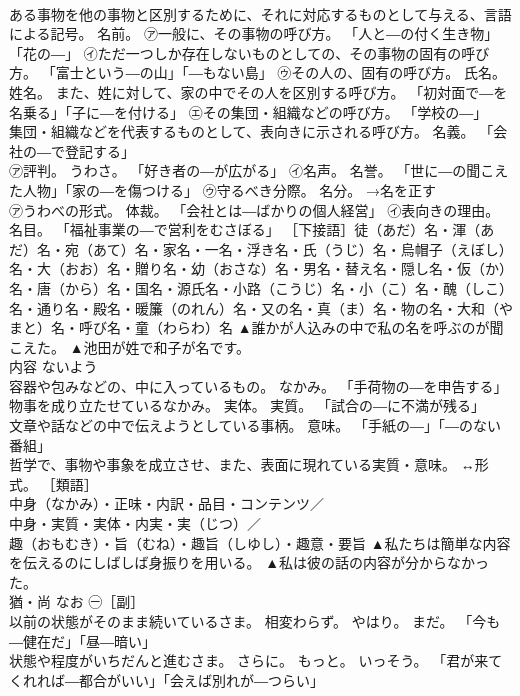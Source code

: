 \documentclass[8pt]{extreport}
\begin{document}
\begin{CJK}{UTF8}{min}
\\	ある事物を他の事物と区別するために、それに対応するものとして与える、言語による記号。 名前。 ㋐一般に、その事物の呼び方。 「人と―の付く生き物」「花の―」 ㋑ただ一つしか存在しないものとしての、その事物の固有の呼び方。 「富士という―の山」「―もない島」 ㋒その人の、固有の呼び方。 氏名。 姓名。 また、姓に対して、家の中でその人を区別する呼び方。 「初対面で―を名乗る」「子に―を付ける」 ㋓その集団・組織などの呼び方。 「学校の―」 
\\	集団・組織などを代表するものとして、表向きに示される呼び方。 名義。 「会社の―で登記する」 
\\	㋐評判。 うわさ。 「好き者の―が広がる」 ㋑名声。 名誉。 「世に―の聞こえた人物」「家の―を傷つける」 ㋒守るべき分際。 名分。 →名を正す 
\\	㋐うわべの形式。 体裁。 「会社とは―ばかりの個人経営」 ㋑表向きの理由。 名目。 「福祉事業の―で営利をむさぼる」 ［下接語］徒（あだ）名・渾（あだ）名・宛（あて）名・家名・一名・浮き名・氏（うじ）名・烏帽子（えぼし）名・大（おお）名・贈り名・幼（おさな）名・男名・替え名・隠し名・仮（か）名・唐（から）名・国名・源氏名・小路（こうじ）名・小（こ）名・醜（しこ）名・通り名・殿名・暖簾（のれん）名・又の名・真（ま）名・物の名・大和（やまと）名・呼び名・童（わらわ）名	▲誰かが人込みの中で私の名を呼ぶのが聞こえた。 ▲池田が姓で和子が名です。
\\	内容	ないよう	
\\	容器や包みなどの、中に入っているもの。 なかみ。 「手荷物の―を申告する」 
\\	物事を成り立たせているなかみ。 実体。 実質。 「試合の―に不満が残る」 
\\	文章や話などの中で伝えようとしている事柄。 意味。 「手紙の―」「―のない番組」 
\\	哲学で、事物や事象を成立させ、また、表面に現れている実質・意味。 ↔形式。 ［類語］
\\	中身（なかみ）・正味・内訳・品目・コンテンツ／
\\	中身・実質・実体・内実・実（じつ）／
\\	趣（おもむき）・旨（むね）・趣旨（しゆし）・趣意・要旨	▲私たちは簡単な内容を伝えるのにしばしば身振りを用いる。 ▲私は彼の話の内容が分からなかった。
\\	猶・尚	なお	㊀［副］ 
\\	以前の状態がそのまま続いているさま。 相変わらず。 やはり。 まだ。 「今も―健在だ」「昼―暗い」 
\\	状態や程度がいちだんと進むさま。 さらに。 もっと。 いっそう。 「君が来てくれれば―都合がいい」「会えば別れが―つらい」 

\end{CJK}
\end{document}
